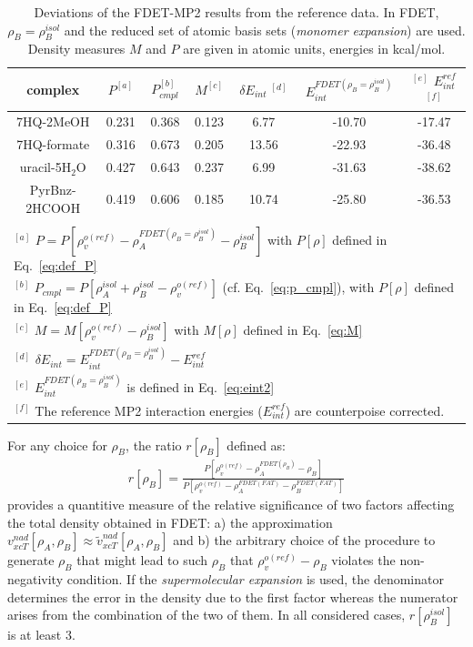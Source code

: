 \documentclass[amsmath,amssymb,preprint,aip,jcp]{revtex4-1}
\begin{document}
\begin{table}
{
\begin{center}
\begin{tabular}{|c|c|c|c|c|c|c|}
\hline
 complex & $P^{[a]}$ & $P_{cmpl}^{[b]}$ & $M^{[c]}$ & $\delta E_{int}\;^{[d]}$ & $E^{FDET(\rho_B=\rho_B^{isol})}_{int}$ & $^{[e]}$ $E_{int}^{ref}$ $^{[f]}$ \\ \hline
7HQ-2MeOH & 0.231 & 0.368 & 0.123 & 6.77 & -10.70 & -17.47 \\ \hline
7HQ-formate & 0.316 & 0.673 & 0.205 & 13.56 & -22.93 & -36.48 \\ \hline
uracil-5H$_2$O & 0.427 & 0.643 & 0.237 & 6.99 & -31.63 & -38.62 \\ \hline
PyrBnz-2HCOOH & 0.419 & 0.606 & 0.185 & 10.74 & -25.80 & -36.53 \\ \hline
\multicolumn{7}{c}{ } \\
\multicolumn{7}{l}{$^{[a]}$ $P=P[\rho_v^{o(ref)} - \rho_{A}^{FDET(\rho_B=\rho_B^{isol})}-\rho_B^{isol}]$ with $P[\rho]$ defined in Eq.~\ref{eq:def_P}}\\
\multicolumn{7}{l}{$^{[b]}$ $P_{cmpl}=P[\rho_A^{isol}+\rho_B^{isol} - \rho_v^{o(ref)}]$ (cf. Eq.~\ref{eq:p_cmpl}), with $P[\rho]$ defined in Eq.~\ref{eq:def_P}}\\
\multicolumn{7}{l}{$^{[c]}$ $M=M[\rho_v^{o(ref)} - \rho^{isol}_{B}]$ with $M[\rho]$ defined in Eq.~\ref{eq:M}}\\
\multicolumn{7}{l}{$^{[d]}$ $\delta E_{int}=E^{FDET(\rho_B=\rho_B^{isol})}_{int}-E_{int}^{ref}$} \\
\multicolumn{7}{l}{$^{[e]}$ $E^{FDET(\rho_B=\rho_B^{isol})}_{int}$ is defined in Eq.~\ref{eq:eint2}}\\
\multicolumn{7}{l}{$^{[f]}$ The reference MP2 interaction energies ($E_{int}^{ref}$) are counterpoise corrected.}
\end{tabular}
\end{center}
}%
\caption{Deviations of the FDET-MP2 results from the reference data. In FDET, $\rho_B=\rho_B^{isol}$ and the reduced set of atomic basis sets ({\it monomer expansion}) are used. 
Density measures $M$ and $P$ are given in atomic units, energies in kcal/mol.
}
\label{table:ME_isol}
\end{table}

For any choice for $\rho_B$,
the ratio $r[\rho_B]$ defined as:
\begin{eqnarray}
r[\rho_B]=\frac{P[\rho_v^{o(ref)} - \rho_{A}^{FDET(\rho_{B})}-\rho_{B}]}{P[\rho_v^{o(ref)} - \rho_{A}^{FDET(FAT)}-\rho_{B}^{FDET(FAT)}]}
\end{eqnarray}
provides a quantitive measure of the relative significance of two factors affecting the total density obtained in FDET:
a) the approximation $v_{xcT}^{nad}[\rho_A,\rho_B]\approx \tilde{v}_{xcT}^{nad}[\rho_A,\rho_B]$ and b) the arbitrary choice of the procedure to generate $\rho_B$ that might lead to such $\rho_B$ that 
$\rho_{v}^{o(ref)}-\rho_B$ violates the non-negativity condition.
If the {\it supermolecular expansion} is used, the denominator determines the error in the density due to the first factor whereas the numerator arises from the combination of the two of them.
In all considered cases, $r[\rho_B^{isol}]$ is at least 3.
\end{document}
